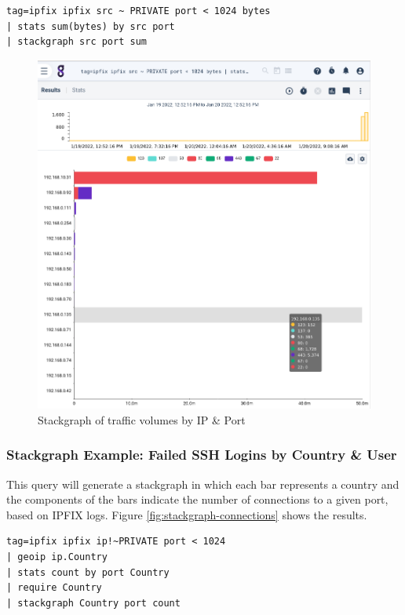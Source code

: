 \begin{Verbatim}[breaklines=true]
tag=ipfix ipfix src ~ PRIVATE port < 1024 bytes 
| stats sum(bytes) by src port 
| stackgraph src port sum
\end{Verbatim}

\begin{figure}[H]
	\includegraphics[width=0.6\linewidth]{images/stackgraph-traffic.png}
	\caption{Stackgraph of traffic volumes by IP \& Port}
	\label{fig:stackgraph-traffic}
\end{figure}

\subsubsection{Stackgraph Example: Failed SSH Logins by Country \& User}

This query will generate a stackgraph in which each bar represents a country and the
components of the bars indicate the number of connections to a given port, based on IPFIX logs.
Figure \ref{fig:stackgraph-connections}
shows the results.

\begin{Verbatim}[breaklines=true]
tag=ipfix ipfix ip!~PRIVATE port < 1024 
| geoip ip.Country 
| stats count by port Country 
| require Country 
| stackgraph Country port count
\end{Verbatim}

